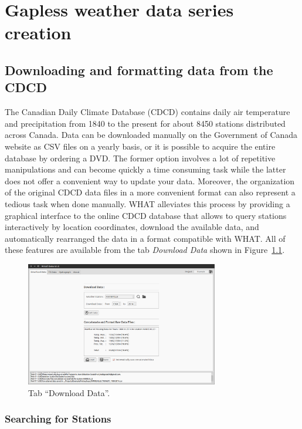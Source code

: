 \documentclass[WHATMANUAL.tex]{subfiles}
\begin{document}
\chapter{Gapless weather data series creation}

\section{Downloading and formatting data from the CDCD}

The Canadian Daily Climate Database (CDCD) contains daily air temperature and precipitation from 1840 to the present for about 8450 stations distributed across Canada. Data can be downloaded manually on the Government of Canada website as CSV files on a yearly basis, or it is possible to acquire the entire database by ordering a DVD. The former option involves a lot of repetitive manipulations and can become quickly a time consuming task while the latter does not offer a convenient way to update your data. Moreover, the organization of the original CDCD data files in a more convenient format can also represent a tedious task when done manually. WHAT alleviates this process by providing a graphical interface to the online CDCD database that allows to query stations interactively by location coordinates, download the available data, and automatically rearranged the data in a format compatible with WHAT. All of these features are available from the tab \emph{Download Data} shown in Figure~\ref{fig:tab_dwnldData}.

\begin{figure}[h!]
\centering
\includegraphics[width=0.75\textwidth]{img/WHAT_Screenshot000}
\caption[Tab ``Download Data''.]{Tab ``Download Data''.}
\label{fig:tab_dwnldData}
\end{figure}

\subsection{Searching for Stations}
\end{document}
